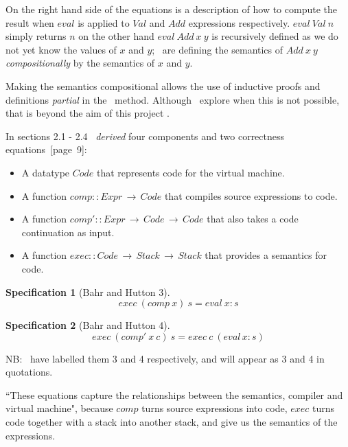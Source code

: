 \documentclass {article}
\begin{document}
On the right hand side of the equations is a
description of how to compute 
the result when $eval$ is applied to $Val$ and
$Add$ expressions respectively.
$eval \ Val \ n$ simply returns $n$
on the other hand $eval \ Add \ x \ y$
is recursively defined as we do not yet know
the values of $x$ and $y$; \BH\ are defining the
semantics of $Add \ x \ y$ \emph{compositionally} by the 
semantics of $x$ and $y$.

Making the semantics compositional allows
the use of inductive proofs and definitions \emph{partial}
in the \BH\ method.
Although \BH\ explore
when this is not possible, that is beyond
the aim of this project \cite{bandh}.

In sections 2.1 - 2.4 \BH\
\emph{derived} four 
components and two correctness equations\cite{bandh}~[page~9]:

\begin{itemize}
	\item A datatype $Code$ that represents
		code for the virtual machine.
	\item A function \( comp::Expr \, \rightarrow \, Code \)
		that compiles source expressions to code.
	\item A function 
		\( comp'::Expr \, \rightarrow \, Code \, \rightarrow \, Code \)
		that also takes a code continuation as input.
	\item A function
		\( exec::Code \, \rightarrow \, Stack \, \rightarrow \, Stack \)
		that provides a semantics for code.
\end{itemize}

\newtheorem{spec}{Specification}
\begin{spec}[Bahr and Hutton 3]
	\[ exec \  (comp \  x) \  s = eval \  x:s \]
\end{spec}
\begin{spec}[Bahr and Hutton 4]
	\[ exec \  (comp' \  x \  c) \ s = exec \  c \  (eval \, x:s) \]
\end{spec}

NB: \BH\ have labelled them 3 and 4 respectively, 
and will appear as 3 and 4 in quotations.

\newcommand{\exec}{$exec$ }
\newcommand{\comp}{$comp$ }
\newcommand{\compp}{$comp'$ }

``These equations capture the relationships between
the semantics, compiler and virtual machine"\cite[page 9]{bandh},
because \comp turns source expressions into code,
\exec turns code together with a stack into another stack,
and \eval give us the semantics of the expressions.
\end{document}
